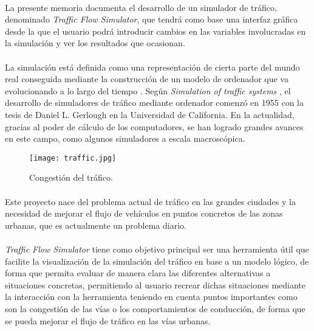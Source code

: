 \paragraph{}
La presente memoria documenta el desarrollo de un simulador de tráfico, denominado \emph{Traffic Flow Simulator}, que tendrá como base una interfaz gráfica desde la que el usuario podrá introducir cambios en las variables involucradas en la simulación y ver los resultados que ocasionan.

\paragraph{}
La simulación está definida como una representación de cierta parte del mundo real conseguida mediante la construcción de un modelo de ordenador que va evolucionando a lo largo del tiempo \cite{Drew1968}. Según \emph{Simulation of traffic systems} \cite{Pursula}, el desarrollo de simuladores de tráfico mediante ordenador comenzó en 1955 con la tesis de Daniel L. Gerlough en la Universidad de California. En la actualidad, gracias al poder de cálculo de los computadores, se han logrado grandes avances en este campo, como algunos simuladores a escala macroscópica.

	\begin{figure}[H]
		\centering
			\texttt{[image: traffic.jpg]}
		\caption{Congestión del tráfico.}
		\label{fig:TrafficJam}
	\end{figure}

\paragraph{}
Este proyecto nace del problema actual de tráfico en las grandes ciudades y la necesidad de mejorar el flujo de vehículos en puntos concretos de las zonas urbanas, que es actualmente un problema diario.

\paragraph{}
\emph{Traffic Flow Simulator} tiene como objetivo principal ser una herramienta útil que facilite la visualización de la simulación del tráfico en base a un modelo lógico, de forma que permita evaluar de manera clara las diferentes alternativas a situaciones concretas, permitiendo al usuario recrear dichas situaciones mediante la interacción con la herramienta teniendo en cuenta puntos importantes como son la congestión de las vías o los comportamientos de conducción, de forma que se pueda mejorar el flujo de tráfico en las vías urbanas.

